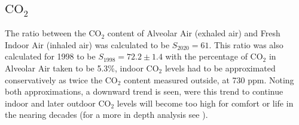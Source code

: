 \documentclass[reprint,amsmath,amssymb,aps, prl,superscriptaddress]{revtex4-2}
\begin{document}
\subsection{$\text{CO}_{2}$}
The ratio between the $\text{CO}_{2}$ content of Alveolar Air (exhaled air) and Fresh Indoor Air (inhaled air) was calculated to be $S_{2020}=61$. This ratio was also calculated for 1998 to be $S_{1998}=72.2\pm1.4$ with the percentage of $\text{CO}_2$ in Alveolar Air taken to be 5.3\%\cite{bookWithCO2inBreath}, 
indoor $\text{CO}_2$ levels had to be approximated conservatively as twice the $\text{CO}_2$ content measured outside, at 730 ppm\cite{tans2009noaa}. Noting both approximations, a downward trend is seen, were this trend to continue indoor and later outdoor $\text{CO}_2$ levels will become too high for comfort or life in the nearing decades (for a more in depth analysis see \cite{Jacobson2019}).
\end{document}
